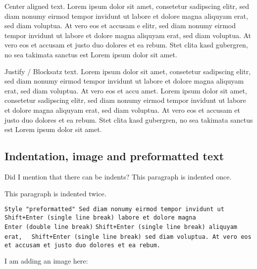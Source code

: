 \begin{center}Center aligned
text. Lorem ipsum dolor sit amet, consetetur sadipscing elitr,
sed diam nonumy eirmod tempor invidunt ut labore et dolore magna
aliquyam erat, sed diam voluptua. At vero eos et accusam e elitr,
sed diam nonumy eirmod tempor invidunt ut labore et dolore magna
aliquyam erat, sed diam voluptua. At vero eos et accusam et justo
duo dolores et ea rebum. Stet clita kasd gubergren, no sea takimata
sanctus est Lorem ipsum dolor sit amet.
\end{center}

Justify /
Blocksatz text. Lorem ipsum dolor sit amet, consetetur
sadipscing elitr, sed diam nonumy eirmod tempor invidunt ut labore
et dolore magna aliquyam erat, sed diam voluptua. At vero eos et
accu amet. Lorem ipsum dolor sit amet, consetetur sadipscing elitr,
sed diam nonumy eirmod tempor invidunt ut labore et dolore magna
aliquyam erat, sed diam voluptua. At vero eos et accusam et justo
duo dolores et ea rebum. Stet clita kasd gubergren, no sea takimata
sanctus est Lorem ipsum dolor sit amet.

\subsection{Indentation, image and preformatted text}

\begin{adjustwidth}{2cm}{}Did I mention
that there can be indents? This paragraph is indented once.
\end{adjustwidth}

\begin{adjustwidth}{4cm}{}This paragraph
is indented twice.
\end{adjustwidth}

\lipsum[3]

\texttt{Style "preformatted" Sed diam nonumy eirmod tempor invidunt ut \\Shift+Enter (single line break) labore et dolore magna\\  Enter (double line break)}
\texttt{Shift+Enter (single line break) aliquyam erat, }
\texttt{   Shift+Enter (single line break) sed diam voluptua. At vero eos et accusam et justo duo dolores et ea rebum.}

I am adding an image here:

\renewcommand{\varCaption}{This is an image with the caption: There are three minutes left on the clock.}
\renewcommand{\varImgPath}{_content/images/3minutes700x400.jpg}


